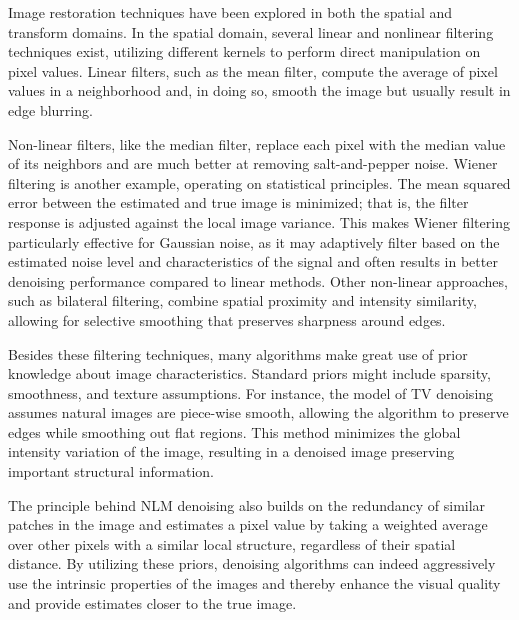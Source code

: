 %
Image restoration techniques have been explored in both the spatial and transform domains. In the spatial domain, several linear and nonlinear filtering techniques exist, utilizing different kernels to perform direct manipulation on pixel values. Linear filters, such as the mean filter, compute the  average of pixel values in a neighborhood and, in doing so, smooth the image but usually result in edge blurring.

Non-linear filters, like the median filter, replace each pixel with the median value of its neighbors and are much better at removing salt-and-pepper noise. Wiener filtering is another example, operating on statistical principles. The mean squared error between the estimated and true image is minimized; that is, the filter response is adjusted against the local image variance. This makes Wiener filtering particularly effective for Gaussian noise, as it may adaptively filter based on the estimated noise level and characteristics of the signal and often results in better denoising performance compared to linear methods. Other non-linear approaches, such as bilateral filtering, combine spatial proximity and intensity similarity, allowing for selective smoothing that  preserves sharpness around edges. 

Besides these filtering techniques, many algorithms make great use of prior knowledge about image characteristics. Standard priors might include sparsity, smoothness, and texture assumptions. For instance, the model of TV denoising assumes natural images are piece-wise smooth, allowing the algorithm to preserve edges while smoothing out flat regions. This method minimizes the global intensity variation of the image, resulting in a denoised image preserving important structural information.

The principle behind \gls{NLM}  denoising also  builds on the redundancy of similar patches in the image and estimates a pixel value by taking a weighted average over other pixels with a similar local structure, regardless of their spatial distance. By utilizing these priors, denoising algorithms can indeed aggressively use the intrinsic properties of the images and thereby enhance the visual quality and provide estimates closer to the true image.

